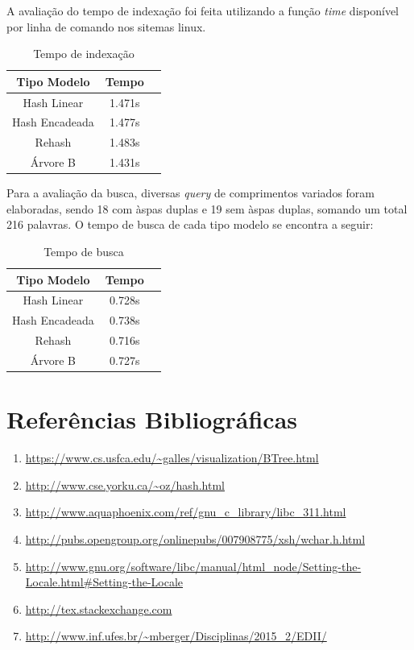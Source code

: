 \documentclass[a4paper,12pt]{article}
\begin{document}
A avaliação do tempo de indexação foi feita utilizando a função \emph{time} disponível por linha de comando nos sitemas linux.


\begin{table}[H]
\centering
\caption{Tempo de indexação}
\begin{tabular}{ccc}
\hline
Tipo Modelo & Tempo \\
\hline
Hash Linear      &   1.471s \\
Hash Encadeada   &   1.477s \\
Rehash           &   1.483s \\ 
Árvore B         &   1.431s \\
\hline
\end{tabular}
\end{table}


Para a avaliação da busca, diversas \emph{query} de comprimentos variados foram elaboradas, sendo 18 com àspas duplas e 19 sem 
àspas duplas, somando um total 216 palavras. O tempo de busca de cada tipo modelo se encontra a seguir:


\begin{table}[H]
\centering
\caption{Tempo de busca}
\begin{tabular}{ccc}
\hline
Tipo Modelo & Tempo \\
\hline
Hash Linear      &   0.728s \\
Hash Encadeada   &   0.738s \\
Rehash           &   0.716s \\ 
Árvore B         &   0.727s \\
\hline
\end{tabular}
\end{table}


\newpage

\section{Referências Bibliográficas}
\begin{enumerate}
\item \url{https://www.cs.usfca.edu/~galles/visualization/BTree.html} 
\item \url{http://www.cse.yorku.ca/~oz/hash.html} 
\item \url{http://www.aquaphoenix.com/ref/gnu_c_library/libc_311.html} 
\item \url{http://pubs.opengroup.org/onlinepubs/007908775/xsh/wchar.h.html} 
\item \url{http://www.gnu.org/software/libc/manual/html_node/Setting-the-Locale.html#Setting-the-Locale}
\item \url{http://tex.stackexchange.com} 
\item \url{http://www.inf.ufes.br/~mberger/Disciplinas/2015_2/EDII/}
\end{enumerate}
\end{document}
